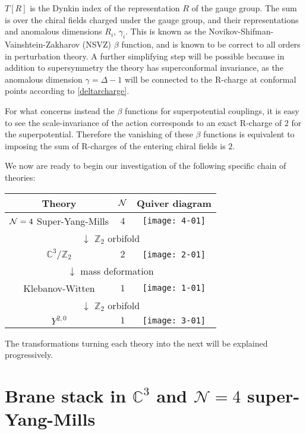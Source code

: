 $T[R]$ is the Dynkin index of the representation $R$ of the gauge group. The sum is over the chiral fields charged under the gauge group, and their representations and anomalous dimensions $R_i$, $\gamma_i$. This is known as the Novikov-Shifman-Vainshtein-Zakharov (NSVZ) $\beta$ function, and is known to be correct to all orders in perturbation theory\cite{Carlino:1999tc}. A further simplifying step will be possible because in addition to supersymmetry the theory has superconformal invariance, as the anomalous dimension $\gamma = \Delta - 1$ will be connected to the R-charge at conformal points according to \eqref{deltarcharge}.

For what concerns instead the $\beta$ functions for superpotential couplings, it is easy to see the scale-invariance of the action corresponds to an exact R-charge of $2$ for the superpotential. Therefore the vanishing of these $\beta$ functions is equivalent to imposing the sum of R-charges of the entering chiral fields is $2$.



We now are ready to begin our investigation of the following specific chain of theories:

\begin{center}
\begin{tabular}{|c | c | c|}
	\hline
	Theory & $\mathcal{N}$ & Quiver diagram  \\
	\hline \hline
	$\mathcal{N} = 4$ Super-Yang-Mills & $4$ & \texttt{[image: 4-01]}\\ \hline 
	\multicolumn{3}{c}{ $\downarrow$ $\mathbb{Z}_2$ orbifold} \\ \hline
	$\mathbb{C}^3/\mathbb{Z}_2$ & $2$ & \texttt{[image: 2-01]} \\ \hline
	\multicolumn{3}{c}{ $\downarrow$ mass deformation} \\ \hline
	Klebanov-Witten & $1$ & \texttt{[image: 1-01]}\\ \hline
	\multicolumn{3}{c}{ $\downarrow$ $\mathbb{Z}_2$ orbifold} \\ \hline
	$Y^{2,0}$ & $1$ & \texttt{[image: 3-01]}\\ \hline
\end{tabular}
\end{center}

The transformations turning each theory into the next will be explained progressively.

\section{Brane stack in $\mathbb{C}^3$ and $\mathcal{N}=4$ super-Yang-Mills} \label{SYM4}

